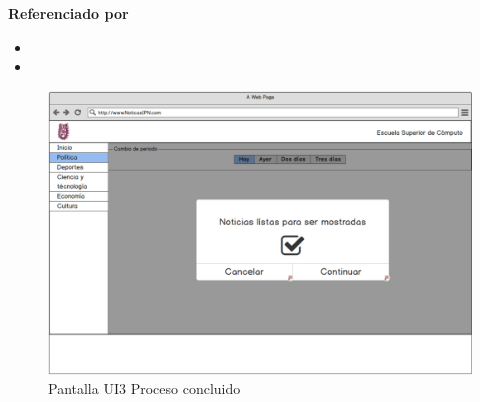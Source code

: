 \begin{large}
  \textbf{Referenciado por}
\end{large}

\begin{itemize}

  \item {}
  \item {}

\end{itemize}  


\begin{figure}
  \centering
	\includegraphics[scale=.35]{imagenes/Pantallas/UI3}
  \caption{Pantalla UI3 Proceso concluido}
  \label{fig:UI3}
\end{figure}
